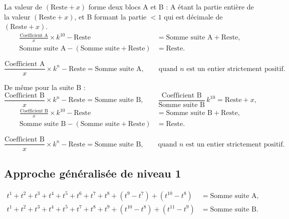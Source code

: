 \documentclass[11pt,a4paper]{article}
\begin{document}
\begin{boitenote}
La valeur de $(\text{Reste} + x)$ forme deux blocs A et B : A étant la partie
entière de la valeur $(\text{Reste} + x)$, et B formant la partie $< 1$ qui est
décimale de $(\text{Reste} + x)$.
\begin{align*}
\frac{\text{Coefficient A}}{x}\times k^{10}-\text{Reste}
&=\text{Somme suite A}+\text{Reste},\\
\text{Somme suite A}-(\text{Somme suite}+\text{Reste})
&=\text{Reste}.
\end{align*}

\vspace{0.3cm}
\begin{boiteformule}
\[
\frac{\text{Coefficient A}}{x} \times k^{n} - \text{Reste} = \text{Somme suite A},
\qquad \text{quand } n \text{ est un entier strictement positif.}
\]
\end{boiteformule}

De même pour la suite B :
\[
\frac{\text{Coefficient B}}{x} \times k^{n} - \text{Reste} = \text{Somme suite B},
\qquad
\frac{\text{Coefficient B}}{\text{Somme suite B}}\, k^{10} = \text{Reste} + x ,
\]
\begin{align*}
\frac{\text{Coefficient B}}{x}\times k^{10}-\text{Reste}
&=\text{Somme suite B}+\text{Reste},\\
\text{Somme suite B}-(\text{Somme suite}+\text{Reste})
&=\text{Reste}.
\end{align*}

\vspace{0.3cm}
\begin{boiteformule}
\[
\frac{\text{Coefficient B}}{x} \times k^{n} - \text{Reste} = \text{Somme suite B},
\qquad \text{quand } n \text{ est un entier strictement positif.}
\]
\end{boiteformule}

\subsection{Approche généralisée de niveau 1}

\vspace{0.3cm}
\begin{boiteformule}[Sommes des suites A et B (forme formelle, $n = 10$)]
\begin{align*}
t^{1}+t^{2}+t^{3}+t^{4}+t^{5}+t^{6}+t^{7}+t^{8}+(t^{9}-t^{7})+(t^{10}-t^{8}) &= \text{Somme suite A},\\
t^{1}+t^{2}+t^{3}+t^{4}+t^{5}+t^{7}+t^{8}+t^{9}+(t^{10}-t^{8})+(t^{11}-t^{9}) &= \text{Somme suite B}.
\end{align*}
\end{boiteformule}


\end{boitenote}
\end{document}
